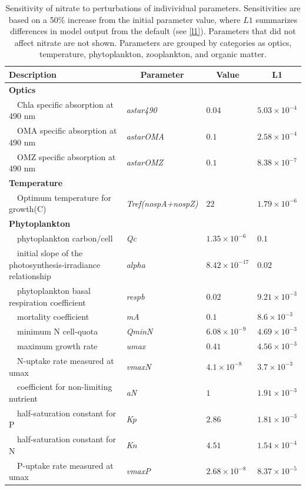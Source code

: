 \documentclass[letterpaper,12pt,oneside]{article}\usepackage[]{graphicx}\usepackage[]{color}
\begin{document}
\begin{table}[!tbp]
{\footnotesize
\caption{Sensitivity of nitrate to perturbations of indivividual parameters.  Sensitivities are based on a 50\% increase from the initial parameter value, where $L1$ summarizes differences in model output from the default (see \cref{l1}).  Parameters that did not affect nitrate are not shown.  Parameters are grouped by categories as optics, temperature, phytoplankton, zooplankton, and organic matter.\label{tab:no3sens}} 
\begin{center}
\begin{tabular}{llll}
\hline\hline
\multicolumn{1}{l}{Description}&\multicolumn{1}{c}{Parameter}&\multicolumn{1}{c}{Value}&\multicolumn{1}{c}{L1}\tabularnewline
\hline
{\bfseries Optics}&&&\tabularnewline
~~Chla specific absorption at 490 nm&\textit{astar490}&$0.04$&$5.03\times 10^{-4}$\tabularnewline
~~OMA specific absorption at 490 nm&\textit{astarOMA}&$0.1$&$2.58\times 10^{-4}$\tabularnewline
~~OMZ specific absorption at 490 nm&\textit{astarOMZ}&$0.1$&$8.38\times 10^{-7}$\tabularnewline
\hline
{\bfseries Temperature}&&&\tabularnewline
~~Optimum temperature for growth(C)&\textit{Tref(nospA+nospZ)}&$22$&$1.79\times 10^{-6}$\tabularnewline
\hline
{\bfseries Phytoplankton}&&&\tabularnewline
~~phytoplankton carbon/cell&\textit{Qc}&$1.35\times 10^{-6}$&$0.1$\tabularnewline
~~initial slope of the photosynthesis-irradiance relationship&\textit{alpha}&$8.42\times 10^{-17}$&$0.02$\tabularnewline
~~phytoplankton basal respiration coefficient&\textit{respb}&$0.02$&$9.21\times 10^{-3}$\tabularnewline
~~mortality coefficient&\textit{mA}&$0.1$&$8.6\times 10^{-3}$\tabularnewline
~~minimum N cell-quota&\textit{QminN}&$6.08\times 10^{-9}$&$4.69\times 10^{-3}$\tabularnewline
~~maximum growth rate&\textit{umax}&$0.41$&$4.56\times 10^{-3}$\tabularnewline
~~N-uptake rate measured at umax&\textit{vmaxN}&$4.1\times 10^{-8}$&$3.7\times 10^{-3}$\tabularnewline
~~coefficient for non-limiting nutrient&\textit{aN}&$1$&$1.91\times 10^{-3}$\tabularnewline
~~half-saturation constant for P&\textit{Kp}&$2.86$&$1.81\times 10^{-3}$\tabularnewline
~~half-saturation constant for N&\textit{Kn}&$4.51$&$1.54\times 10^{-4}$\tabularnewline
~~P-uptake rate measured at umax&\textit{vmaxP}&$2.68\times 10^{-8}$&$8.37\times 10^{-5}$\tabularnewline

\end{tabular}
\end{center}}
\end{table}
\end{document}
